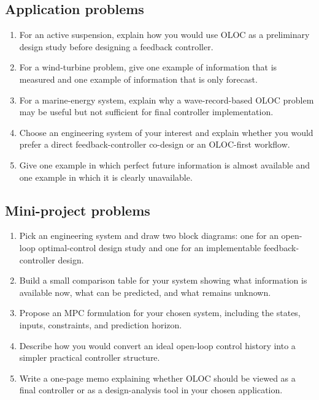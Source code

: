 \documentclass[11pt]{article}
\begin{document}
\subsection*{Application problems}
\begin{enumerate}[leftmargin=1.5em,label=\textbf{P\arabic*.},resume]
  \item For an active suspension, explain how you would use OLOC as a preliminary design study before designing a feedback controller.
  \item For a wind-turbine problem, give one example of information that is measured and one example of information that is only forecast.
  \item For a marine-energy system, explain why a wave-record-based OLOC problem may be useful but not sufficient for final controller implementation.
  \item Choose an engineering system of your interest and explain whether you would prefer a direct feedback-controller co-design or an OLOC-first workflow.
  \item Give one example in which perfect future information is almost available and one example in which it is clearly unavailable.
\end{enumerate}

\subsection*{Mini-project problems}
\begin{enumerate}[leftmargin=1.5em,label=\textbf{P\arabic*.},resume]
  \item Pick an engineering system and draw two block diagrams: one for an open-loop optimal-control design study and one for an implementable feedback-controller design.
  \item Build a small comparison table for your system showing what information is available now, what can be predicted, and what remains unknown.
  \item Propose an MPC formulation for your chosen system, including the states, inputs, constraints, and prediction horizon.
  \item Describe how you would convert an ideal open-loop control history into a simpler practical controller structure.
  \item Write a one-page memo explaining whether OLOC should be viewed as a final controller or as a design-analysis tool in your chosen application.
\end{enumerate}
\end{document}
